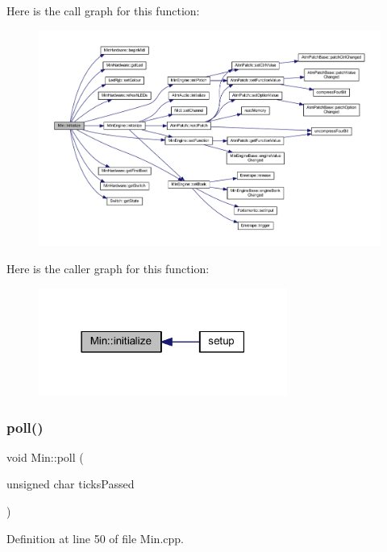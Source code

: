 Here is the call graph for this function\+:
\nopagebreak
\begin{figure}[H]
\begin{center}
\leavevmode
\includegraphics[width=350pt]{class_min_a0fbb740ee813f44c6b0082d9a980875c_cgraph}
\end{center}
\end{figure}
Here is the caller graph for this function\+:
\nopagebreak
\begin{figure}[H]
\begin{center}
\leavevmode
\includegraphics[width=231pt]{class_min_a0fbb740ee813f44c6b0082d9a980875c_icgraph}
\end{center}
\end{figure}
\mbox{\label{class_min_a4ed53c28c8c59dba741daf945dbc160b}} 
\subsubsection{\texorpdfstring{poll()}{poll()}}
{\footnotesize\ttfamily void Min\+::poll (\begin{DoxyParamCaption}\item[{unsigned char}]{ticks\+Passed }\end{DoxyParamCaption})}



Definition at line 50 of file Min.\+cpp.

